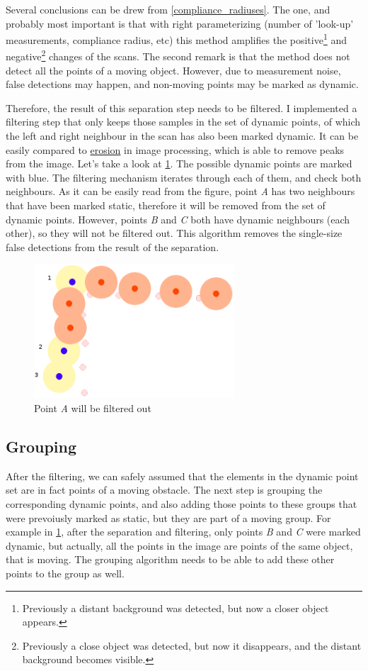 Several conclusions can be drew from \ref{compliance_radiuses}. The one, and probably most important is that with right parameterizing (number of 'look-up' measurements, compliance radius, etc) this method amplifies the positive\footnote{Previously a distant background was detected, but now a closer object appears.} and negative\footnote{Previously a close object was detected, but now it disappears, and the distant background becomes visible.} changes of the scans. The second remark is that the method does not detect all the points of a moving object. However, due to measurement noise, false detections may happen, and non-moving points may be marked as dynamic.

Therefore, the result of this separation step needs to be filtered. I implemented a filtering step that only keeps those samples in the set of dynamic points, of which the left and right neighbour in the scan has also been marked dynamic. It can be easily compared to \href{https://en.wikipedia.org/wiki/Erosion_(morphology)}{erosion} in image processing, which is able to remove peaks from the image. Let's take a look at \ref{dynamic_points}. The possible dynamic points are marked with blue. The filtering mechanism iterates through each of them, and check both neighbours. As it can be easily read from the figure, point \textit{A} has two neighbours that have been marked static, therefore it will be removed from the set of dynamic points. However, points \textit{B} and \textit{C} both have dynamic neighbours (each other), so they will not be filtered out. This algorithm removes the single-size false detections from the result of the separation.

\begin{figure}[!ht]
    \centering
    \includegraphics[height=50mm]{figures/raw/dynamic_points.png}
    \caption{Point \textit{A} will be filtered out}
    \label{dynamic_points}
\end{figure}

\subsection{Grouping}
After the filtering, we can safely assumed that the elements in the dynamic point set are in fact points of a moving obstacle. The next step is grouping the corresponding dynamic points, and also adding those points to these groups that were prevoiusly marked as static, but they are part of a moving group. For example in \ref{dynamic_points}, after the separation and filtering, only points \textit{B} and \textit{C} were marked dynamic, but actually, all the points in the image are points of the same object, that is moving. The grouping algorithm needs to be able to add these other points to the group as well.

